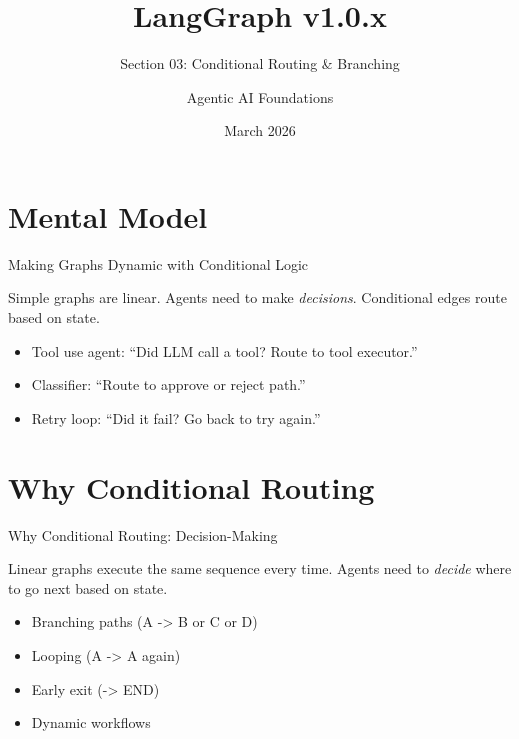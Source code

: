 \documentclass[aspectratio=169,11pt]{beamer}
\title{LangGraph v1.0.x}
\subtitle{Section 03: Conditional Routing \& Branching}
\author{Agentic AI Foundations}
\date{March 2026}
\begin{document}
\begin{frame}
\titlepage
\end{frame}

\section{Mental Model}
\begin{frame}[t]{Making Graphs Dynamic with Conditional Logic}
\setlength{\itemsep}{1pt}
\vspace{0.1cm}

\begin{conceptbox}[Conditional Routing = Agentic Flow]
Simple graphs are linear. Agents need to make \textit{decisions}. Conditional edges route based on state.
\end{conceptbox}

\vspace{0.15cm}

\begin{tipbox}[Examples]
\setlength{\itemsep}{1pt}
\begin{itemize}
  \item Tool use agent: ``Did LLM call a tool? Route to tool executor.''
  \item Classifier: ``Route to approve or reject path.''
  \item Retry loop: ``Did it fail? Go back to try again.''
\end{itemize}
\end{tipbox}
\end{frame}

\section{Why Conditional Routing}
\begin{frame}[t]{Why Conditional Routing: Decision-Making}
\setlength{\itemsep}{1pt}
\vspace{0.1cm}

\begin{warningbox}
Linear graphs execute the same sequence every time. Agents need to \textit{decide} where to go next based on state.
\end{warningbox}

\vspace{0.15cm}

\begin{conceptbox}
\setlength{\itemsep}{1pt}
\begin{itemize}
  \item Branching paths (A -> B or C or D)
  \item Looping (A -> A again)
  \item Early exit (-> END)
  \item Dynamic workflows
\end{itemize}
\end{conceptbox}
\end{frame}
\end{document}
